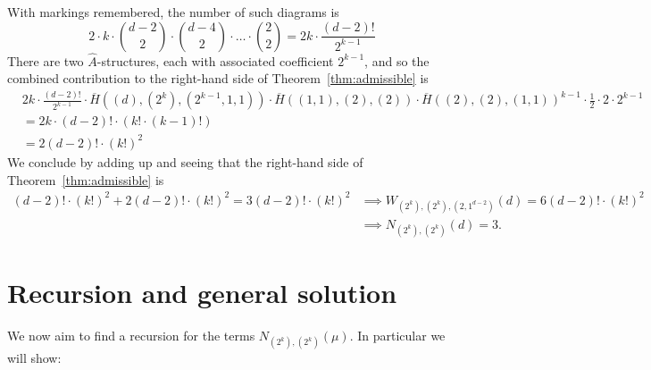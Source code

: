 \documentclass[thesis]{thesis-umich}           %
\theoremstyle{definition}
\begin{document}
            With markings remembered, the number of such diagrams is
            \[
            2\cdot k\cdot\binom{d-2}{2}\cdot\binom{d-4}{2}\cdot\dots\cdot\binom 22=2k\cdot\frac{(d-2)!}{2^{k-1}}
            \]
            There are two $\hat A$-structures, each with associated coefficient $2^{k-1}$,
            and so the combined contribution to the right-hand side of Theorem~\ref{thm:admissible} is
            \begin{align*}
              &2k\cdot\frac{(d-2)!}{2^{k-1}}\cdot\overline H((d),(2^k),(2^{k-1},1,1))\cdot \overline H((1,1),(2),(2))\cdot \overline H((2),(2),(1,1))^{k-1}\cdot\frac 12\cdot 2\cdot 2^{k-1} \\
              &=2k\cdot (d-2)!\cdot (k!\cdot (k-1)!) \\
              &=2(d-2)!\cdot (k!)^2
            \end{align*}
            We conclude by adding up and seeing that the right-hand side of Theorem~\ref{thm:admissible} is
            \begin{align*}
              (d-2)!\cdot (k!)^2+ 2(d-2)!\cdot (k!)^2=3(d-2)!\cdot (k!)^2&\implies W_{(2^k),(2^k),(2,1^{d-2})}(d)=6(d-2)!\cdot (k!)^2 \\
              &\implies N_{(2^k),(2^k)}(d)=3.
            \end{align*}


\section{Recursion and general solution}

We now aim to find a recursion for the terms $N_{(2^k),(2^k)}(\mu)$. In particular we will show:
\end{document}
